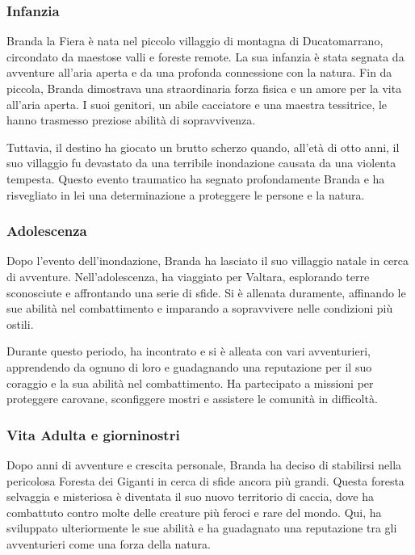 \subsubsection{Infanzia}\label{infanzia}


Branda la Fiera è nata nel piccolo villaggio di montagna di
Ducatomarrano, circondato da maestose valli e foreste remote. La sua
infanzia è stata segnata da avventure all'aria aperta e da una profonda
connessione con la natura. Fin da piccola, Branda dimostrava una
straordinaria forza fisica e un amore per la vita all'aria aperta. I
suoi genitori, un abile cacciatore e una maestra tessitrice, le hanno
trasmesso preziose abilità di sopravvivenza.

Tuttavia, il destino ha giocato un brutto scherzo quando, all'età di
otto anni, il suo villaggio fu devastato da una terribile inondazione
causata da una violenta tempesta. Questo evento traumatico ha segnato
profondamente Branda e ha risvegliato in lei una determinazione a
proteggere le persone e la natura.

\subsubsection{Adolescenza}\label{adolescenza}


Dopo l'evento dell'inondazione, Branda ha lasciato il suo villaggio
natale in cerca di avventure. Nell'adolescenza, ha viaggiato per
Valtara, esplorando terre sconosciute e affrontando una serie di sfide.
Si è allenata duramente, affinando le sue abilità nel combattimento e
imparando a sopravvivere nelle condizioni più ostili.

Durante questo periodo, ha incontrato e si è alleata con vari
avventurieri, apprendendo da ognuno di loro e guadagnando una
reputazione per il suo coraggio e la sua abilità nel combattimento. Ha
partecipato a missioni per proteggere carovane, sconfiggere mostri e
assistere le comunità in difficoltà.

\subsubsection{Vita Adulta e giorninostri}\label{vita-adulta-e-giorni-nostri}

Dopo anni di avventure e crescita personale, Branda ha deciso di
stabilirsi nella pericolosa Foresta dei Giganti in cerca di sfide ancora
più grandi. Questa foresta selvaggia e misteriosa è diventata il suo
nuovo territorio di caccia, dove ha combattuto contro molte delle
creature più feroci e rare del mondo. Qui, ha sviluppato ulteriormente
le sue abilità e ha guadagnato una reputazione tra gli avventurieri come
una forza della natura.

